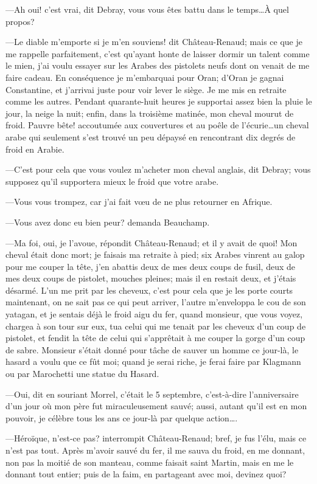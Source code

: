 —Ah oui! c'est vrai, dit Debray, vous vous êtes battu dans le temps\dots À quel propos? 

—Le diable m'emporte si je m'en souviens! dit Château-Renaud; mais ce que je me rappelle parfaitement, c'est qu'ayant honte de laisser dormir un talent comme le mien, j'ai voulu essayer sur les Arabes des pistolets neufs dont on venait de me faire cadeau. En conséquence je m'embarquai pour Oran; d'Oran je gagnai Constantine, et j'arrivai juste pour voir lever le siège. Je me mis en retraite comme les autres. Pendant quarante-huit heures je supportai assez bien la pluie le jour, la neige la nuit; enfin, dans la troisième matinée, mon cheval mourut de froid. Pauvre bête! accoutumée aux couvertures et au poêle de l'écurie\dots un cheval arabe qui seulement s'est trouvé un peu dépaysé en rencontrant dix degrés de froid en Arabie. 

—C'est pour cela que vous voulez m'acheter mon cheval anglais, dit Debray; vous supposez qu'il supportera mieux le froid que votre arabe. 

—Vous vous trompez, car j'ai fait vœu de ne plus retourner en Afrique. 

—Vous avez donc eu bien peur? demanda Beauchamp. 

—Ma foi, oui, je l'avoue, répondit Château-Renaud; et il y avait de quoi! Mon cheval était donc mort; je faisais ma retraite à pied; six Arabes vinrent au galop pour me couper la tête, j'en abattis deux de mes deux coups de fusil, deux de mes deux coups de pistolet, mouches pleines; mais il en restait deux, et j'étais désarmé. L'un me prit par les cheveux, c'est pour cela que je les porte courts maintenant, on ne sait pas ce qui peut arriver, l'autre m'enveloppa le cou de son yatagan, et je sentais déjà le froid aigu du fer, quand monsieur, que vous voyez, chargea à son tour sur eux, tua celui qui me tenait par les cheveux d'un coup de pistolet, et fendit la tête de celui qui s'apprêtait à me couper la gorge d'un coup de sabre. Monsieur s'était donné pour tâche de sauver un homme ce jour-là, le hasard a voulu que ce fût moi; quand je serai riche, je ferai faire par Klagmann ou par Marochetti une statue du Hasard. 

—Oui, dit en souriant Morrel, c'était le 5 septembre, c'est-à-dire l'anniversaire d'un jour où mon père fut miraculeusement sauvé; aussi, autant qu'il est en mon pouvoir, je célèbre tous les ans ce jour-là par quelque action\dots. 

—Héroïque, n'est-ce pas? interrompit Château-Renaud; bref, je fus l'élu, mais ce n'est pas tout. Après m'avoir sauvé du fer, il me sauva du froid, en me donnant, non pas la moitié de son manteau, comme faisait saint Martin, mais en me le donnant tout entier; puis de la faim, en partageant avec moi, devinez quoi? 

